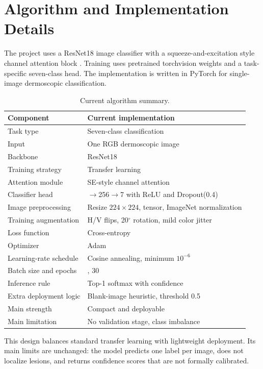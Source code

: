 \section{Algorithm and Implementation Details}

The project uses a ResNet18 image classifier \citep{he2016resnet} with a squeeze-and-excitation style channel attention block \citep{hu2018senet}. Training uses pretrained torchvision weights and a task-specific seven-class head. The implementation is written in PyTorch \citep{paszke2019pytorch} for single-image dermoscopic classification.

\begin{table}[H]
    \centering
    \caption{Current algorithm summary.}
    \label{tab:algorithm}
    \begin{tabular}{>{\raggedright\arraybackslash}p{} >{\raggedright\arraybackslash}p{}}
        \toprule
        Component & Current implementation \\
        \midrule
        Task type & Seven-class classification \\
        Input & One RGB dermoscopic image \\
        Backbone & ResNet18 \\
        Training strategy & Transfer learning \\
        Attention module & SE-style channel attention \\
        Classifier head & 512$\rightarrow$256$\rightarrow$7 with ReLU and Dropout(0.4) \\
        Image preprocessing & Resize \(224\times224\), tensor, ImageNet normalization \\
        Training augmentation & H/V flips, 20$^\circ$ rotation, mild color jitter \\
        Loss function & Cross-entropy \\
        Optimizer & Adam \\
        Learning-rate schedule & Cosine annealing, minimum \(10^{-6}\) \\
        Batch size and epochs & 32, 30 \\
        Inference rule & Top-1 softmax with confidence \\
        Extra deployment logic & Blank-image heuristic, threshold 0.5 \\
        Main strength & Compact and deployable \\
        Main limitation & No validation stage, class imbalance \\
        \bottomrule
    \end{tabular}
\end{table}

This design balances standard transfer learning with lightweight deployment. Its main limits are unchanged: the model predicts one label per image, does not localize lesions, and returns confidence scores that are not formally calibrated.
